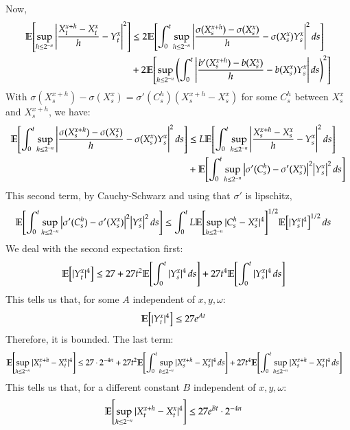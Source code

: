 \documentclass[12pt]{article}
\theoremstyle{definitionstyle}
\newcommand{\1}{\mathds 1}
\newcommand{\E}{\mathbb E \qty}
\begin{document}
    Now,
    \begin{align*}
        \E[\sup_{h \leq 2^{-n}} \qty|\frac{X_t^{x+h}-X_t^x}{h} - Y_t^x|^2] &\leq 2\E[\int_0^t \sup_{h \leq 2^{-n}} \qty|\frac{\sigma(X_s^{x+h}) - \sigma(X_s^x)}{h} - \sigma(X_s^x)Y_s^x|^2 \, ds] 
        \\ &+ 2\E[\sup_{h \leq 2^{-n}} \qty(\int_0^t \qty|\frac{b'(X_s^{x+h}) - b(X_s^x)}{h} - b(X_s^x)Y_s^x| \, ds)^2]
    \end{align*}
    With $\sigma(X_s^{x+h}) - \sigma(X_s^x) = \sigma'(C_s^h)(X_s^{x+h} - X_s^x)$ for some $C_s^h$ between $X_s^x$ and $X_s^{x+h}$, we have:
    \begin{align*}
        \E[\int_0^t \sup_{h \leq 2^{-n}} \qty|\frac{\sigma(X_s^{x+h}) - \sigma(X_s^x)}{h} - \sigma(X_s^x)Y_s^x|^2 \, ds] &\leq L\E[\int_0^t \sup_{h \leq 2^{-n}} \qty|\frac{X_s^{x+h} - X_s^x}{h} - Y_s^x|^2 \, ds] \\
        &+ \E[\int_0^t \sup_{h \leq 2^{-n}} \qty|\sigma'(C_s^h) - \sigma'(X_s^x)|^2 \qty|Y_s^x|^2 \, ds]
    \end{align*}
    This second term, by Cauchy-Schwarz and using that $\sigma'$ is lipschitz,
    \begin{align*}
        \E[\int_0^t \sup_{h \leq 2^{-n}} \qty|\sigma'(C_s^h) - \sigma'(X_s^x)|^2 \qty|Y_s^x|^2 \, ds] &\leq \int_0^t L\E[\sup_{h \leq 2^{-n}}|C_s^h - X_s^x|^4]^{1/2} \E[|Y_s^x|^4]^{1/2} \, ds
    \end{align*}
    We deal with the second expectation first:
    \begin{align*}
        \E[|Y_t^x|^4] &\leq 27 + 27t^2\E[\int_0^t |Y_s^x|^4 \, ds] + 27t^4 \E[\int_0^t |Y_s^x|^4 \, ds]
    \end{align*}
    This tells us that, for some $A$ independent of $x,y,\omega$:
    \begin{align*}
        \E[|Y_t^x|^4] &\leq 27e^{At}
    \end{align*}
    Therefore, it is bounded. The last term:
    \begin{align*}
        \E[\sup_{h \leq 2^{-n}} |X_t^{x+h} - X_t^x|^4] &\leq 27 \cdot 2^{-4n} + 27t^2 \E[\int_0^t \sup_{h \leq 2^{-n}}|X_s^{x+h} - X_s^x|^4 \, ds] + 27t^4 \E[\int_0^t \sup_{h \leq 2^{-n}}|X_s^{x+h} - X_s^x|^4 \, ds]
    \end{align*}
    This tells us that, for a different constant $B$ independent of $x,y,\omega$:
    \begin{align*}
        \E[\sup_{h \leq 2^{-n}} |X_t^{x+h} - X_t^x|^4] &\leq 27 e^{Bt} \cdot 2^{-4n} 
    \end{align*}
\end{document}

